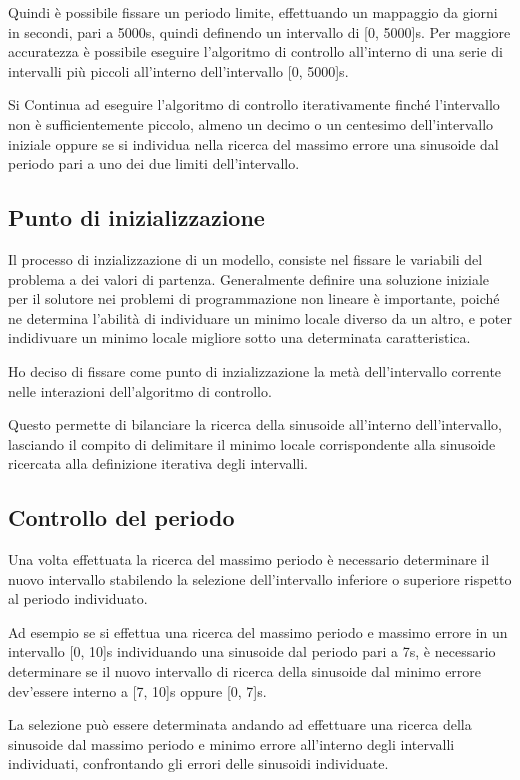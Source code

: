 \documentclass[a4paper,12pt]{report}
\begin{document}
Quindi è possibile fissare un periodo limite, effettuando un mappaggio da giorni in secondi, pari a 5000s, quindi definendo un intervallo di [0, 5000]s.
Per maggiore accuratezza è possibile eseguire l'algoritmo di controllo all'interno di una serie di intervalli più piccoli all'interno dell'intervallo [0, 5000]s.

Si Continua ad eseguire l'algoritmo di controllo iterativamente finché l'intervallo non è sufficientemente piccolo, almeno un decimo o un centesimo dell'intervallo iniziale oppure se si individua nella ricerca del massimo errore una sinusoide dal periodo pari a uno dei due limiti dell'intervallo.

\subsection{Punto di inizializzazione}
Il processo di inzializzazione di un modello, consiste nel fissare le variabili del problema a dei valori di partenza. Generalmente definire una soluzione iniziale per il solutore nei problemi di programmazione non lineare è importante, poiché ne determina l'abilità di individuare un minimo locale diverso da un altro, e poter indidivuare un minimo locale migliore sotto una determinata caratteristica.

Ho deciso di fissare come punto di inzializzazione la metà dell'intervallo corrente nelle interazioni dell'algoritmo di controllo.

Questo permette di bilanciare la ricerca della sinusoide all'interno dell'intervallo, lasciando il compito di delimitare il minimo locale corrispondente alla sinusoide ricercata alla definizione iterativa degli intervalli.


\subsection{Controllo del periodo}
\label{con:periodo}
Una volta effettuata la ricerca del massimo periodo è necessario determinare il nuovo intervallo stabilendo la selezione dell'intervallo inferiore o superiore rispetto al periodo individuato.

Ad esempio se si effettua una ricerca del massimo periodo e massimo errore in un intervallo [0, 10]s individuando una sinusoide dal periodo pari a 7s, è necessario determinare se il nuovo intervallo di ricerca della sinusoide dal minimo errore dev'essere interno a [7, 10]s oppure [0, 7]s.

La selezione può essere determinata andando ad effettuare una ricerca della sinusoide dal massimo periodo e minimo errore all'interno degli intervalli individuati, confrontando gli errori delle sinusoidi individuate.
\end{document}
